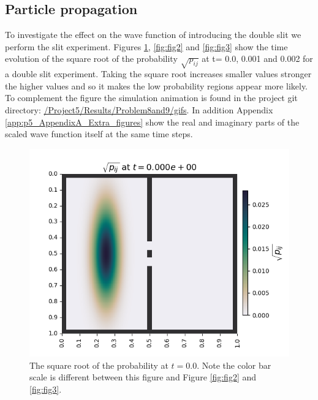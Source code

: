 \documentclass[../main_proj5.tex]{subfiles}
\begin{document}
\subsection{Particle propagation}

To investigate the effect on the wave function of introducing the double slit we perform the slit experiment. Figures \ref{fig:fig1}, \ref{fig:fig2} and \ref{fig:fig3} show the time evolution of the square root of the probability $\sqrt{p_{ij}}$ at  t= 0.0, 0.001 and 0.002 for a double slit experiment. Taking the square root increases smaller values stronger the higher values and so it makes the low probability regions appear more likely. To complement the figure the simulation animation is found in the project git directory: \href{https://github.uio.no/johannlf/FYS3150/tree/main/Project5/Results/Problem%208%20and%209/Gifs}{/Project5/Results/Problem8and9/gifs}. In addition Appendix \ref{app:p5_AppendixA_Extra_figures} show the real and imaginary parts of the scaled wave function itself at the same time steps. 

\begin{figure}[htbp]
    \centering
    \includegraphics[width=.8\linewidth]{Project 5/figures/problem8and9_M201_Nslits2_sqrtpij_000.png}
    \caption{The square root of the probability at \( t = 0.0 \). Note the color bar scale is different between this figure and Figure \ref{fig:fig2} and \ref{fig:fig3}.}
    \label{fig:fig1}
\end{figure}
\end{document}
